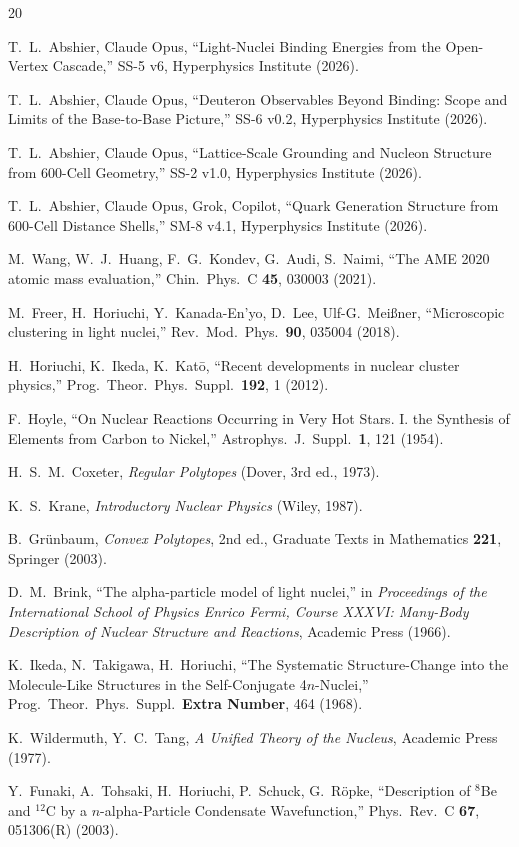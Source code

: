 \documentclass[11pt,letterpaper]{article}
\begin{document}
\begin{thebibliography}{20}

T.~L.~Abshier, Claude Opus, ``Light-Nuclei Binding Energies from the Open-Vertex Cascade,'' SS-5 v6, Hyperphysics Institute (2026).

T.~L.~Abshier, Claude Opus, ``Deuteron Observables Beyond Binding: Scope and Limits of the Base-to-Base Picture,'' SS-6 v0.2, Hyperphysics Institute (2026).

T.~L.~Abshier, Claude Opus, ``Lattice-Scale Grounding and Nucleon Structure from 600-Cell Geometry,'' SS-2 v1.0, Hyperphysics Institute (2026).

T.~L.~Abshier, Claude Opus, Grok, Copilot, ``Quark Generation Structure from 600-Cell Distance Shells,'' SM-8 v4.1, Hyperphysics Institute (2026).

M.~Wang, W.~J.~Huang, F.~G.~Kondev, G.~Audi, S.~Naimi, ``The AME 2020 atomic mass evaluation,'' Chin.\ Phys.\ C \textbf{45}, 030003 (2021).

M.~Freer, H.~Horiuchi, Y.~Kanada-En'yo, D.~Lee, Ulf-G.~Mei{\ss}ner, ``Microscopic clustering in light nuclei,'' Rev.\ Mod.\ Phys.\ \textbf{90}, 035004 (2018).

H.~Horiuchi, K.~Ikeda, K.~Kat{\= o}, ``Recent developments in nuclear cluster physics,'' Prog.\ Theor.\ Phys.\ Suppl.\ \textbf{192}, 1 (2012).

F.~Hoyle, ``On Nuclear Reactions Occurring in Very Hot Stars. I. the Synthesis of Elements from Carbon to Nickel,'' Astrophys.\ J.\ Suppl.\ \textbf{1}, 121 (1954).

H.~S.~M.~Coxeter, \emph{Regular Polytopes} (Dover, 3rd ed., 1973).

K.~S.~Krane, \emph{Introductory Nuclear Physics} (Wiley, 1987).

B.~Gr{\"u}nbaum, \emph{Convex Polytopes}, 2nd ed., Graduate Texts in Mathematics \textbf{221}, Springer (2003).

D.~M.~Brink, ``The alpha-particle model of light nuclei,'' in \emph{Proceedings of the International School of Physics Enrico Fermi, Course XXXVI: Many-Body Description of Nuclear Structure and Reactions}, Academic Press (1966).

K.~Ikeda, N.~Takigawa, H.~Horiuchi, ``The Systematic Structure-Change into the Molecule-Like Structures in the Self-Conjugate 4$n$-Nuclei,'' Prog.\ Theor.\ Phys.\ Suppl.\ \textbf{Extra Number}, 464 (1968).

K.~Wildermuth, Y.~C.~Tang, \emph{A Unified Theory of the Nucleus}, Academic Press (1977).

Y.~Funaki, A.~Tohsaki, H.~Horiuchi, P.~Schuck, G.~R{\"o}pke, ``Description of ${}^{8}$Be and ${}^{12}$C by a $n$-alpha-Particle Condensate Wavefunction,'' Phys.\ Rev.\ C \textbf{67}, 051306(R) (2003).

\end{thebibliography}
\end{document}
